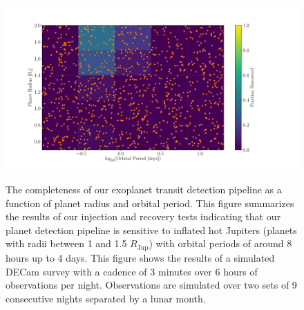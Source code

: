
\begin{figure}
  \caption{The completeness of our exoplanet transit detection pipeline as a
    function of planet radius and orbital period.
    This figure summarizes the results of our injection and recovery tests
    indicating that our planet detection pipeline is sensitive to inflated hot
    Jupiters (planets with radii between 1 and 1.5 $R_{\mathrm{Jup}}$) with
    orbital periods of around 8 hours up to 4 days.
    This figure shows the results of a simulated DECam survey with a cadence
    of 3 minutes over 6 hours of observations per night.  Observations are
    simulated over two sets of 9 consecutive nights separated
    by a lunar month.
}
  \centering
    \includegraphics[width=1\textwidth]{../completeness.pdf}
\label{fig:completeness}
\end{figure}

